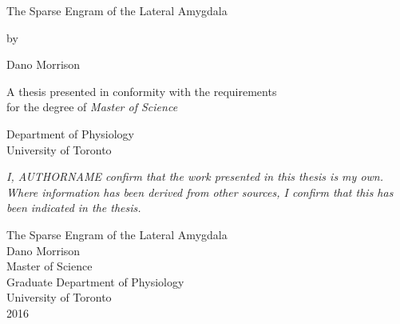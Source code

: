 \documentclass[12pt,a4paper,]{report}
\date{}
\begin{document}
\begin{titlepage}
    \begin{center}

    
   
        
        \vspace*{2.5cm}
        
        \huge
        The Sparse Engram of the Lateral Amygdala
        
        \vspace{1.5cm}

        by
        \vspace{1.5cm}
        
        \Large
        Dano Morrison

        \vspace{1.5cm}

        \normalsize
        A thesis presented in conformity with the requirements\\
        for the degree of \textit{Master of Science}
        
        \vfill
        
        \normalsize
        Department of Physiology\\
        University of Toronto

        \vspace{0.8cm}


    \end{center}
\end{titlepage}

\vspace*{\fill}

\noindent  \textit{
I, AUTHORNAME confirm that the work presented in this thesis is my own. Where information has been derived from other sources, I confirm that this has been indicated in the thesis.
} \vspace*{\fill}

\begin{center}
\Large
      The Sparse Engram of the Lateral Amygdala\\[2ex]
      Dano Morrison\\
      Master of Science\\
      Graduate Department of Physiology\\
      University of Toronto\\
      2016\\
\end{center}
\end{document}
